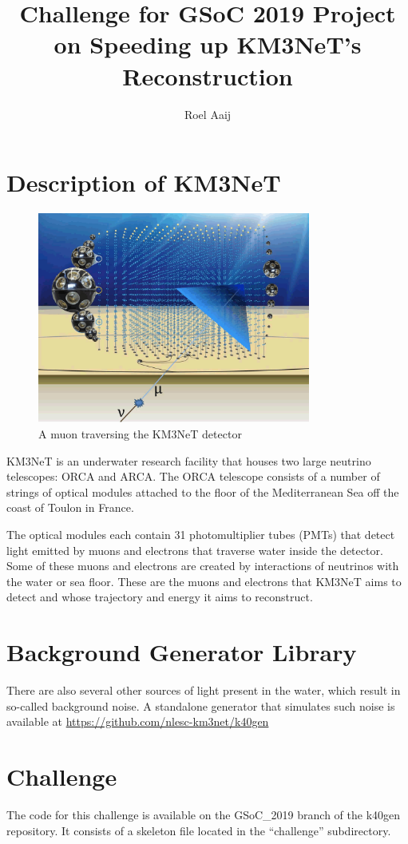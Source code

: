 \documentclass{article}
\title{Challenge for GSoC 2019 Project on Speeding up KM3NeT's Reconstruction}
\author{Roel Aaij}
\begin{document}
\section{Description of KM3NeT}

\begin{figure}
  \center
  \includegraphics[width=0.8\textwidth]{KM3NeT-NeutrinoToMuon.png}
  \caption{A muon traversing the KM3NeT detector}
\end{figure}

KM3NeT is an underwater research facility that houses two large
neutrino telescopes: ORCA and ARCA. The ORCA telescope consists of a
number of strings of optical modules attached to the floor of the
Mediterranean Sea off the coast of Toulon in France.

The optical modules each contain 31 photomultiplier tubes (PMTs) that
detect light emitted by muons and electrons that traverse water inside
the detector. Some of these muons and electrons are created by
interactions of neutrinos with the water or sea floor. These are the
muons and electrons that KM3NeT aims to detect and whose trajectory
and energy it aims to reconstruct.

\section{Background Generator Library}

There are also several other sources of light present in the water,
which result in so-called background noise. A standalone generator
that simulates such noise is available at
\href{https://github.com/nlesc-km3net/k40gen}{https://github.com/nlesc-km3net/k40gen}

\section{Challenge}

The code for this challenge is available on the GSoC_2019 branch of
the k40gen repository. It consists of a skeleton file located in the
``challenge'' subdirectory.
\end{document}
